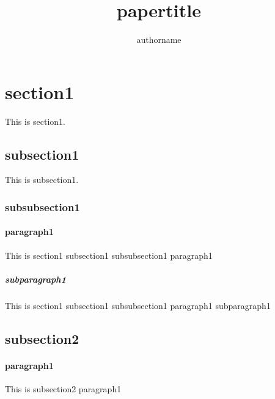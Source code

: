 \documentclass{article}
\author{authorname}
\title{papertitle}
\begin{document}
   
	\maketitle   
	\section{section1} This is section1.     
		\subsection{subsection1} This is subsection1.       
			\subsubsection{subsubsection1}         
				\paragraph{paragraph1}
					This is section1  subsection1 subsubsection1        paragraph1
           	 		\subparagraph{subparagraph1} 
						This is section1  subsection1 subsubsection1        paragraph1 subparagraph1        
		\subsection{subsection2}         
			\paragraph{paragraph1}
				This is  subsection2 paragraph1
\end{document}
